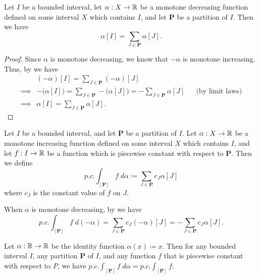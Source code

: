 \begin{ac}\label{i:ac:11.8.3}
  Let \(I\) be a bounded interval, let \(\alpha : X \to \mathbb{R}\) be a monotone decreasing function defined on some interval \(X\) which contains \(I\), and let \(\mathbf{P}\) be a partition of \(I\).
  Then we have
  \[
    \alpha[I] = \sum_{J \in \mathbf{P}} \alpha[J].
  \]
\end{ac}

\begin{proof}
  Since \(\alpha\) is monotone decreasing, we know that \(-\alpha\) is monotone increasing.
  Thus, by  we have
  \begin{align*}
             & (-\alpha)[I] = \sum_{J \in \mathbf{P}} (-\alpha)[J]                                                                                  \\
    \implies & -\big(\alpha[I]\big) = \sum_{J \in \mathbf{P}} -\big(\alpha[J]\big) = -\sum_{J \in \mathbf{P}} \alpha[J] &  & \text{(by limit laws)} \\
    \implies & \alpha[I] = \sum_{J \in \mathbf{P}} \alpha[J].
  \end{align*}
\end{proof}

\begin{defn}\label{i:11.8.5}
  Let \(I\) be a bounded interval, and let \(\mathbf{P}\) be a partition of \(I\).
  Let \(\alpha : X \to \mathbb{R}\) be a monotone increasing function defined on some interval \(X\) which contains \(I\), and let \(f : I \to \mathbb{R}\) be a function which is piecewise constant with respect to \(\mathbf{P}\).
  Then we define
  \[
    p.c. \int_{[\mathbf{P}]} f \; d \alpha \coloneqq \sum_{J \in \mathbf{P}} c_J \alpha[J]
  \]
  where \(c_J\) is the constant value of \(f\) on \(J\).
\end{defn}

\begin{note}
  When \(\alpha\) is monotone decreasing, by  we have
  \[
    p.c. \int_{[\mathbf{P}]} f \; d (-\alpha) = \sum_{J \in \mathbf{P}} c_J (-\alpha)[J] = - \sum_{J \in \mathbf{P}} c_J \alpha[J].
  \]
\end{note}

\setcounter{thm}{6}
\begin{eg}\label{i:11.8.7}
  Let \(\alpha : \mathbb{R} \to \mathbb{R}\) be the identity function \(\alpha(x) \coloneqq x\).
  Then for any bounded interval \(I\), any partition \(\mathbf{P}\) of \(I\), and any function \(f\) that is piecewise constant with respect to \(P\), we have \(p.c. \int_{[\mathbf{P}]} f \; d \alpha = p.c. \int_{[\mathbf{P}]} f\).
\end{eg}

